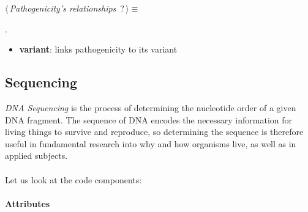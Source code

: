 	\begin{flushleft} \small
\begin{minipage}{\linewidth}\label{scrap9}\raggedright\small
{} $\langle\,${\itshape {Pathogenicity's relationships}}\nobreak\ {\footnotesize {?}}$\,\rangle\equiv$
\vspace{-1ex}
\begin{list}{}{} \item

                
        {\NWsep}
\end{list}
\vspace{-1.5ex}
\footnotesize
\begin{list}{}{\setlength{\itemsep}{-\parsep}\setlength{\itemindent}{-\leftmargin}}
\item {\NWtxtMacroNoRef}.

\item{}
\end{list}
\end{minipage}\vspace{4ex}
\end{flushleft}
\begin{itemize}
 	\item \textbf{variant}: links pathogenicity to its variant
\end{itemize}


\subsection{Sequencing}
\emph{DNA Sequencing} is the process of determining the nucleotide order of a given DNA fragment. The sequence of DNA encodes the necessary information for living things to survive and reproduce, so determining the sequence is therefore useful in fundamental research into why and how organisms live, as well as in applied subjects.
\\
\\Let us look at the code components:

\paragraph{Attributes}      

